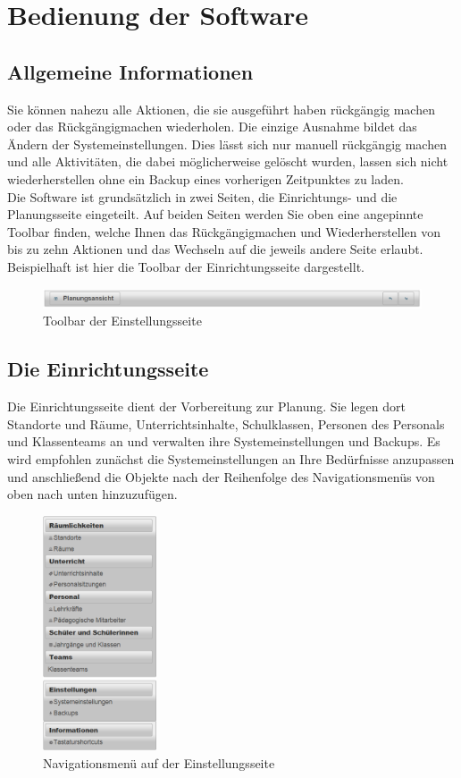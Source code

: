 \documentclass[fontsize=12pt]{scrartcl}
\begin{document}
\section{Bedienung der Software}

\subsection{Allgemeine Informationen}

Sie können nahezu alle Aktionen, die sie ausgeführt haben rückgängig machen oder das Rückgängigmachen wiederholen. Die einzige Ausnahme bildet das Ändern der Systemeinstellungen. Dies lässt sich nur manuell rückgängig machen und alle Aktivitäten, die dabei möglicherweise gelöscht wurden, lassen sich nicht wiederherstellen ohne ein Backup eines vorherigen Zeitpunktes zu laden.\\

Die Software ist grundsätzlich in zwei Seiten, die Einrichtungs- und die Planungsseite eingeteilt. Auf beiden Seiten werden Sie oben eine angepinnte Toolbar finden, welche Ihnen das Rückgängigmachen und Wiederherstellen von bis zu zehn Aktionen und das Wechseln auf die jeweils andere Seite erlaubt. Beispielhaft ist hier die Toolbar der Einrichtungsseite dargestellt.

\begin{figure}[H]
\includegraphics[width=\textwidth]{images/bar.png}
\caption{Toolbar der Einstellungsseite}
\end{figure}

\subsection{Die Einrichtungsseite}
Die Einrichtungsseite dient der Vorbereitung zur Planung. Sie legen dort Standorte und Räume, Unterrichtsinhalte, Schulklassen, Personen des Personals und Klassenteams an und verwalten ihre Systemeinstellungen und Backups. Es wird empfohlen zunächst die Systemeinstellungen an Ihre Bedürfnisse anzupassen und anschließend die Objekte nach der Reihenfolge des Navigationsmenüs von oben nach unten hinzuzufügen.
\begin{figure}[H]
\centering
\includegraphics[width=0.3\textwidth]{images/navigationMenu.png}
\caption{Navigationsmenü auf der Einstellungsseite}
\end{figure}
\end{document}
